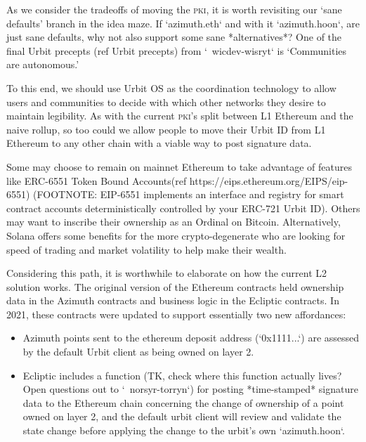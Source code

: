 \documentclass[twoside]{article}
\begin{document}
As we consider the tradeoffs of moving the \textsc{pki}, it is worth revisiting our `sane defaults' branch in the idea maze. If `azimuth.eth` and with it `azimuth.hoon`, are just sane defaults, why not also support some sane *alternatives*? One of the final Urbit precepts (ref Urbit precepts) from  `~wicdev-wisryt` is `Communities are autonomous.'

To this end, we should use Urbit OS as the coordination technology to allow users and communities to decide with which other networks they desire to maintain legibility. As with the current \textsc{pki}'s split between L1 Ethereum and the naive rollup, so too could we allow people to move their Urbit ID from L1 Ethereum to any other chain with a viable way to post signature data. 

Some may choose to remain on mainnet Ethereum to take advantage of features like ERC-6551 Token Bound Accounts(ref https://eips.ethereum.org/EIPS/eip-6551) (FOOTNOTE: EIP-6551 implements an interface and registry for smart contract accounts deterministically controlled by your ERC-721 Urbit ID). Others may want to inscribe their ownership as an Ordinal on Bitcoin. Alternatively, Solana offers some benefits for the more crypto-degenerate who are looking for speed of trading and market volatility to help make their wealth. 

Considering this path, it is worthwhile to elaborate on how the current L2 solution works. The original version of the Ethereum contracts held ownership data in the Azimuth contracts and business logic in the Ecliptic contracts. In 2021, these contracts were updated to support essentially two new affordances:

\begin{itemize}
  \item  Azimuth points sent to the ethereum deposit address (`0x1111...`) are assessed by the default Urbit client as being owned on layer 2.
  \item  Ecliptic includes a function (TK, check where this function actually lives? Open questions out to `~norsyr-torryn`) for posting *time-stamped* signature data to the Ethereum chain concerning the change of ownership of a point owned on layer 2, and the default urbit client will review and validate the state change before applying the change to the urbit's own `azimuth.hoon`.
\end{itemize}
\end{document}
